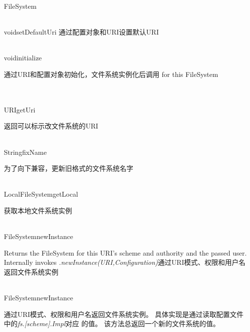 \begin{XeClass}{FileSystem}
\begin{XeMethod}{\XePublic\\ }{void}{setDefaultUri}
 通过配置对象和URI设置默认URI

  \end{XeMethod}

  \begin{XeMethod}{\XePublic\\ }{void}{initialize}
       
 通过URI和配置对象初始化，文件系统实例化后调用
 for this FileSystem

  \end{XeMethod}

  \begin{XeMethod}{\XePublic\\ \XeAbstract\\ }{URI}{getUri}
       
 返回可以标示改文件系统的URI

  \end{XeMethod}

  \begin{XeMethod}{\XePrivate\\ }{String}{fixName}
       
 为了向下兼容，更新旧格式的文件系统名字

  \end{XeMethod}

  \begin{XeMethod}{\XePublic\\ }{LocalFileSystem}{getLocal}
       
 获取本地文件系统实例

  \end{XeMethod}

  \begin{XeMethod}{\XePublic\\ }{FileSystem}{newInstance}
       
 Returns the FileSystem for this URI's scheme and authority and the
 passed user. Internally invokes \emph{.newInstance(URI,Configuration)}通过URI模式、权限和用户名返回文件系统实例

  \end{XeMethod}

  \begin{XeMethod}{\XePublic\\ }{FileSystem}{newInstance}
       
 通过URI模式、权限和用户名返回文件系统实例。
 具体实现是通过读取配置文件中的\emph{fs.[scheme].Impl}对应
 的值。
 该方法总返回一个新的文件系统的值。

  \end{XeMethod}


\end{XeClass}
